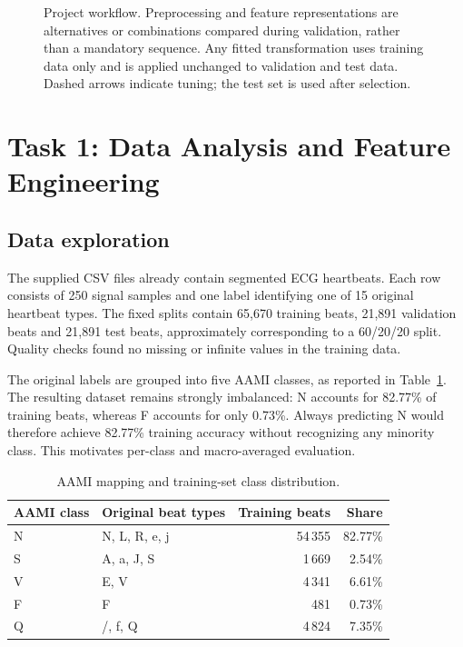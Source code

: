 \documentclass[11pt,oneside,a4paper]{article}
\begin{document}
\begin{figure}[htbp]
        \caption{Project workflow. Preprocessing and feature representations
        are alternatives or combinations compared during validation, rather
        than a mandatory sequence. Any fitted transformation uses training
        data only and is applied unchanged to validation and test data.
        Dashed arrows indicate tuning; the test set is used after selection.}
        \label{fig:classification_workflow}
    \end{figure}
    \section{Task 1: Data Analysis and Feature Engineering}
    \subsection{Data exploration}
    The supplied CSV files already contain segmented ECG heartbeats.
    Each row consists of 250 signal samples and one label identifying
    one of 15 original heartbeat types. The fixed splits contain
    65,670 training beats, 21,891 validation beats and 21,891 test beats,
    approximately corresponding to a 60/20/20 split. Quality checks
    found no missing or infinite values in the training data.

    The original labels are grouped into five AAMI classes, as reported
    in Table~\ref{tab:aami_classes}. The resulting dataset remains
    strongly imbalanced: N accounts for 82.77\% of training beats,
    whereas F accounts for only 0.73\%. Always predicting N would
    therefore achieve 82.77\% training accuracy without recognizing
    any minority class. This motivates per-class and macro-averaged
    evaluation.

    \begin{table}[htbp]
        \centering
        \begin{tabular}{llrr}
            \toprule
            AAMI class & Original beat types & Training beats & Share \\
            \midrule
            N & N, L, R, e, j & 54\,355 & 82.77\% \\
            S & A, a, J, S    & 1\,669  & 2.54\%  \\
            V & E, V         & 4\,341  & 6.61\%  \\
            F & F            & 481     & 0.73\%  \\
            Q & /, f, Q      & 4\,824  & 7.35\%  \\
            \bottomrule
        \end{tabular}
        \caption{AAMI mapping and training-set class distribution.}
        \label{tab:aami_classes}
    \end{table}
\end{document}
